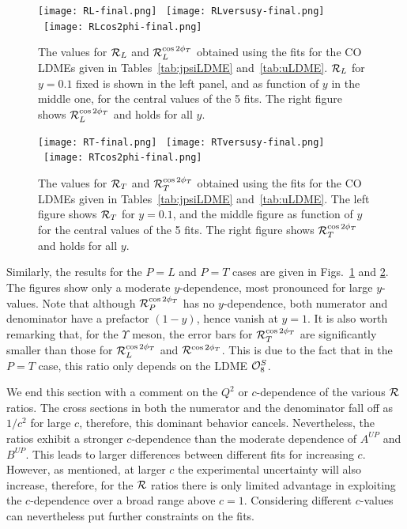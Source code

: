 \documentclass[prd,aps,preprintnumbers,nofootinbib,superscriptaddress]{revtex4}
\newcommand{\sT}{{\scriptscriptstyle T}}
\begin{document}
\begin{figure}[t] %
   \centering
   \texttt{[image: RL-final.png]} \
    \texttt{[image: RLversusy-final.png]} \
     \texttt{[image: RLcos2phi-final.png]} 
      \caption{The values for ${\cal R}_L$ and ${\cal R}_L^{\cos2\phi_\sT}$ obtained using the fits for the CO LDMEs given in Tables~\ref{tab:jpsiLDME} and~\ref{tab:uLDME}. ${\cal R}_L$ for $y=0.1$ fixed is shown in the left panel, and as function of $y$ in the middle one, for the central values of the 5 fits. The right figure shows ${\cal R}_L^{\cos2\phi_\sT}$ and holds for all $y$.}
      \label{fig:RL}
\end{figure}
\begin{figure}[b] %
   \centering
   \texttt{[image: RT-final.png]} \
    \texttt{[image: RTversusy-final.png]} \
     \texttt{[image: RTcos2phi-final.png]} 
      \caption{The values for ${\cal R}_T$ and ${\cal R}_T^{\cos2\phi_\sT}$ obtained using the fits for the CO LDMEs given in Tables~\ref{tab:jpsiLDME} and~\ref{tab:uLDME}.  The left figure shows ${\cal R}_T$ for $y=0.1$, and the middle figure as function of $y$ for the central values of the 5 fits. The right figure shows ${\cal R}_T^{\cos2\phi_\sT}$ and holds for all $y$.}
      \label{fig:RT}
\end{figure}
Similarly, the results for the $P=L$ and $P=T$ cases are given in Figs.\ \ref{fig:RL} and \ref{fig:RT}.
The figures show only a moderate $y$-dependence, most pronounced for large $y$-values.  
Note that although ${\cal R}_P^{\cos2\phi_\sT}$ has no $y$-dependence, both numerator and denominator have a prefactor $(1-y)$, hence vanish at $y=1$. It is also worth remarking that, for the $\Upsilon$ meson, the error bars for ${\cal R}_T^{\cos2\phi_\sT}$ are significantly smaller than those for ${\cal R}_L^{\cos2\phi_\sT}$ and ${\cal R}^{\cos2\phi_\sT}$. This is due to the fact that in the $P=T$ case, this ratio only depends on the LDME ${\cal O}_8^S$.

We end this section with a comment on the $Q^2$ or $c$-dependence of the various ${\cal R}$ ratios. The cross sections in both the numerator and the denominator fall off as $1/c^2$ for large $c$, therefore, this dominant behavior cancels. Nevertheless, the ratios exhibit a stronger $c$-dependence than the moderate dependence of $A^{UP}$ and $B^{UP}$. This leads to larger differences between different fits for increasing $c$. However, as mentioned, at larger $c$ the experimental uncertainty will also increase, therefore, for the ${\cal R}$ ratios there is only limited advantage in exploiting the $c$-dependence over a broad range above $c=1$. Considering different $c$-values can nevertheless put further constraints on the fits.
\end{document}
